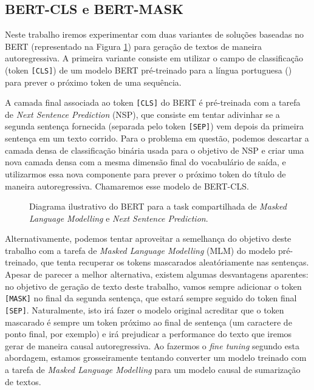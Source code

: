 \documentclass{article}
\begin{document}
\subsection{BERT-CLS e BERT-MASK}

Neste trabalho iremos experimentar com duas variantes de soluções baseadas no BERT (representado na Figura \ref{bert_fig}) para geração de textos de maneira autoregressiva. A primeira variante consiste em utilizar o campo de classificação (token \texttt{[CLS]}) de um modelo BERT pré-treinado para a língua portuguesa (\textcite{souza2020bertimbau}) para prever o próximo token de uma sequência.

A camada final associada ao token \texttt{[CLS]} do BERT é pré-treinada com a tarefa de \textit{Next Sentence Prediction} (NSP), que consiste em tentar adivinhar se a segunda sentença fornecida (separada pelo token \texttt{[SEP]}) vem depois da primeira sentença em um texto corrido. Para o problema em questão, podemos descartar a camada densa de classificação binária usada para o objetivo de NSP e criar uma nova camada densa com a mesma dimensão final do vocabulário de saída, e utilizarmos essa nova componente para prever o próximo token do título de maneira autoregressiva. Chamaremos esse modelo de BERT-CLS.

\begin{figure}[h]
	
	\label{bert_fig}
	\caption{Diagrama ilustrativo do BERT para a task compartilhada de \textit{Masked Language Modelling} e \textit{Next Sentence Prediction}. }
	\centering
\end{figure}

Alternativamente, podemos tentar aproveitar a semelhança do objetivo deste trabalho com a tarefa de \textit{Masked Language Modelling} (MLM) do modelo pré-treinado, que tenta recuperar os tokens mascarados aleatóriamente nas sentenças. Apesar de parecer a melhor alternativa, existem algumas desvantagens aparentes: no objetivo de geração de texto deste trabalho, vamos sempre adicionar o token \texttt{[MASK]} no final da segunda sentença, que estará sempre seguido do token final \texttt{[SEP]}. Naturalmente, isto irá fazer o modelo original acreditar que o token mascarado é sempre um token próximo ao final de sentença (um caractere de ponto final, por exemplo) e irá prejudicar a performance do texto que iremos gerar de maneira causal autoregressiva. Ao fazermos o \textit{fine tuning} segundo esta abordagem, estamos grosseiramente tentando converter um modelo treinado com a tarefa de \textit{Masked Language Modelling} para um modelo causal de sumarização de textos.
\end{document}
